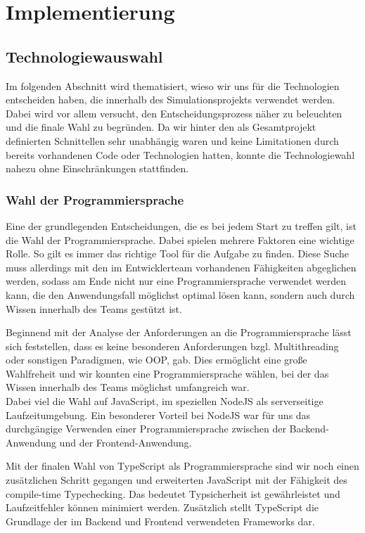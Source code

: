 \chapter{Implementierung}

\section{Technologiewauswahl}

Im folgenden Abschnitt wird thematisiert, wieso wir uns für die Technologien entscheiden haben, die innerhalb des Simulationsprojekts verwendet werden. Dabei wird vor allem versucht, den Entscheidungsprozess näher zu beleuchten und die finale Wahl zu begründen. Da wir hinter den als Gesamtprojekt definierten Schnittellen sehr unabhängig waren und keine Limitationen durch bereits vorhandenen Code oder Technologien hatten, konnte die Technologiewahl nahezu ohne Einschränkungen stattfinden.

\subsection*{Wahl der Programmiersprache}
Eine der grundlegenden Entscheidungen, die es bei jedem Start zu treffen gilt, ist die Wahl der Programmiersprache. Dabei spielen mehrere Faktoren eine wichtige Rolle. So gilt es immer das richtige Tool für die Aufgabe zu finden. Diese Suche muss allerdings mit den im Entwicklerteam vorhandenen Fähigkeiten abgeglichen werden, sodass am Ende nicht nur eine Programmiersprache verwendet werden kann, die den Anwendungsfall möglichst optimal lösen kann, sondern auch durch Wissen innerhalb des Teams gestützt ist.

Beginnend mit der Analyse der Anforderungen an die Programmiersprache lässt sich feststellen, dass es keine besonderen Anforderungen bzgl. Multithreading oder sonstigen Paradigmen, wie OOP, gab. Dies ermöglicht eine große Wahlfreheit und wir konnten eine Programmiersprache wählen, bei der das Wissen innerhalb des Teams möglichst umfangreich war.\\
Dabei viel die Wahl auf JavaScript, im speziellen NodeJS als serverseitige Laufzeitumgebung. Ein besonderer Vorteil bei NodeJS war für uns das durchgängige Verwenden einer Programmiersprache zwischen der Backend-Anwendung und der Frontend-Anwendung.

Mit der finalen Wahl von TypeScript als Programmiersprache sind wir noch einen zusätzlichen Schritt gegangen und erweiterten JavaScript mit der Fähigkeit des compile-time Typechecking. Das bedeutet Typsicherheit ist gewährleistet und Laufzeitfehler können minimiert werden. Zusätzlich stellt TypeScript die Grundlage der im Backend und Frontend verwendeten Frameworks dar.

